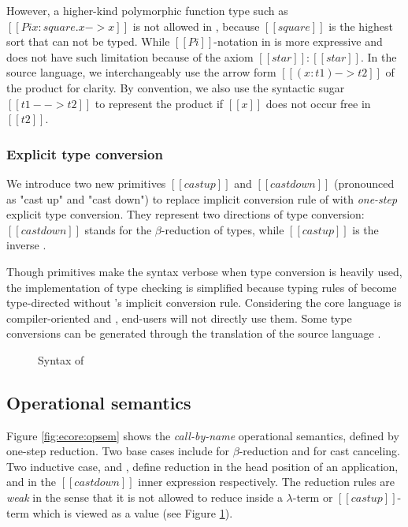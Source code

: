 However, a higher-kind polymorphic function type such as $[[Pi x:square.x->x]]$ is not allowed in \cc, because $[[square]]$ is the highest sort that can not be typed. While $[[Pi]]$-notation in \ecore is more expressive and does not have such limitation because of the axiom $[[star]]:[[star]]$. In the source language, we interchangeably use the arrow form $[[(x:t1)->t2]]$ of the product for clarity. By convention, we also use the syntactic sugar $[[t1 --> t2]]$ to represent the product if $[[x]]$ does not occur free in $[[t2]]$.

\subsubsection{Explicit type conversion}
We introduce two new primitives $[[castup]]$ and $[[castdown]]$ (pronounced as "cast up" and "cast down") to replace implicit conversion rule of \cc with \emph{one-step} explicit type conversion. They represent two directions of type conversion: $[[castdown]]$ stands for the $\beta$-reduction of types, while $[[castup]]$ is the inverse .

Though \cast primitives make the syntax verbose when type conversion is heavily used, the implementation of type checking is simplified because typing rules of \ecore become type-directed without \cc's implicit conversion rule. Considering the core language is compiler-oriented and , end-users will not directly use them. Some type conversions can be generated through the translation of the source language \fixme{(\S \ref{sec:src})}.

\begin{figure}
    \gram{\ottec\ottinterrule
        \ottG\ottinterrule
        \ottv}
    \caption{Syntax of \ecore}
    \label{fig:ecore:syntax}
\end{figure}

\subsection{Operational semantics}\label{sec:ecore:opsem}
Figure \ref{fig:ecore:opsem} shows the \emph{call-by-name} operational semantics, defined by one-step reduction. Two base cases include  for $\beta$-reduction and  for cast canceling. Two inductive case,  and , define reduction in the head position of an application, and in the $[[castdown]]$ inner expression respectively. The reduction rules are \emph{weak} in the sense that it is not allowed to reduce inside a $\lambda$-term or $[[castup]]$-term which is viewed as a value (see Figure \ref{fig:ecore:syntax}).

